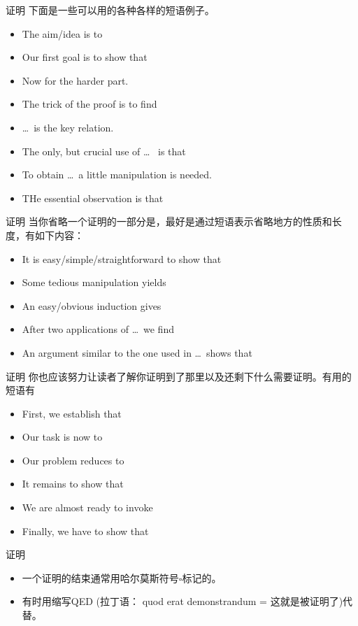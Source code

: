 \documentclass[13pt]{ctexbeamer}
\begin{document}
\begin{frame}{证明}
下面是一些可以用的各种各样的短语例子。
\begin{itemize}
\item The aim/idea is to 
\item Our first goal is to show that 
\item Now for the harder part.
\item The trick of the proof is to find
\item \dots ~is the key relation.
\item The only, but crucial use of  \dots~ is that 
\item To obtain \dots ~a little manipulation is needed.
\item THe essential observation is that 
\end{itemize}
\end{frame}


\begin{frame}{证明}
当你省略一个证明的一部分是，最好是通过短语表示省略地方的性质和长度，有如下内容：
	\begin{itemize}
		\item It is easy/simple/straightforward to show that 
		\item Some tedious manipulation yields
		\item An easy/obvious induction gives 
		\item After two applications of  \dots ~we find
		\item An argument similar to the one used in  \dots ~shows that 
	\end{itemize}
\end{frame}

\begin{frame}{证明}
你也应该努力让读者了解你证明到了那里以及还剩下什么需要证明。有用的短语有
	\begin{itemize}
		\item First, we establish that 
		\item Our task is now to 
		\item Our problem reduces to 
		\item It remains to show that 
		\item We are almost ready to invoke 
		\item Finally, we have to show that 
	\end{itemize}
\end{frame}

\begin{frame}{证明}
\begin{itemize}
\item 
一个证明的结束通常用哈尔莫斯符号$\square$标记的。
\item 
有时用缩写QED  (拉丁语： quod erat demonstrandum = 这就是被证明了)代替。
\end{itemize}
\end{frame}
\end{document}
